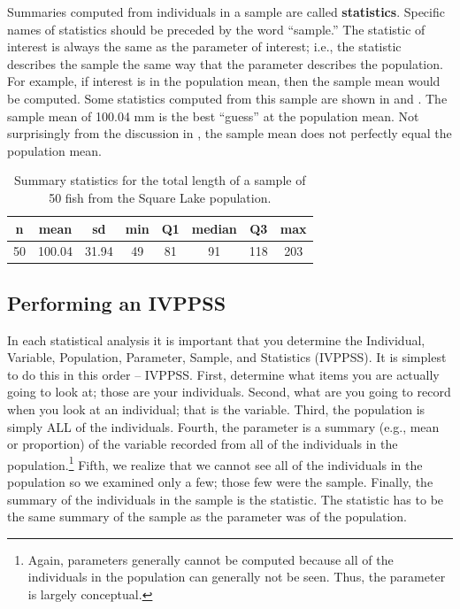 \documentclass[10pt,openany]{book}\usepackage[]{graphicx}\usepackage[]{color}
\begin{document}

Summaries computed from individuals in a sample are called \textbf{statistics}.  Specific names of statistics should be preceded by the word ``sample.''  The statistic of interest is always the same as the parameter of interest; i.e., the statistic describes the sample the same way that the parameter describes the population.  For example, if interest is in the population mean, then the sample mean would be computed.  Some statistics computed from this sample are shown in  and .  The sample mean of 100.04 mm is the best ``guess'' at the population mean.  Not surprisingly from the discussion in , the sample mean does not perfectly equal the population mean.

\begin{table}[ht]
\centering
\caption{Summary statistics for the total length of a sample of 50 fish from the Square Lake population.} 
\label{tab:SquareLakeSample1}
\begin{tabular}{cccccccc}
 n & mean & sd & min & Q1 & median & Q3 & max \\ 
  \hline
50 & 100.04 & 31.94 & 49 & 81 & 91 & 118 & 203 \\ 
   \hline
\end{tabular}
\end{table}



\subsection{Performing an IVPPSS}
In each statistical analysis it is important that you determine the Individual, Variable, Population, Parameter, Sample, and Statistics (IVPPSS).  It is simplest to do this in this order -- IVPPSS.  First, determine what items you are actually going to look at; those are your individuals.  Second, what are you going to record when you look at an individual; that is the variable.  Third, the population is simply ALL of the individuals.  Fourth, the parameter is a summary (e.g., mean or proportion) of the variable recorded from all of the individuals in the population.\footnote{Again, parameters generally cannot be computed because all of the individuals in the population can generally not be seen.  Thus, the parameter is largely conceptual.}  Fifth, we realize that we cannot see all of the individuals in the population so we examined only a few; those few were the sample.  Finally, the summary of the individuals in the sample is the statistic.  The statistic has to be the same summary of the sample as the parameter was of the population.
\end{document}

